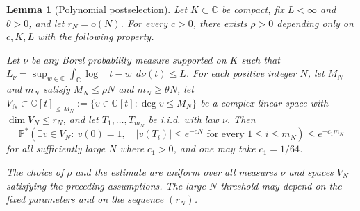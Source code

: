 \documentclass[10pt,reqno]{amsart}
\newtheorem{lemma}[theorem]{Lemma}
\theoremstyle{remark}
\newcommand{\C}{\mathbb C}
\newcommand{\Prob}{\mathbb P}
\newcommand{\logm}{\log^-}
\begin{document}
\begin{lemma}[Polynomial postselection]\label{lem:postselection}
Let $K\subset\C$ be compact, fix $L<\infty$ and $\theta>0$, and let
$r_N=o(N)$. For every $c>0$, there exists $\rho>0$ depending only on $c, K, L$ with the following property.

Let $\nu$ be any Borel probability measure supported on $K$ such that $L_\nu=\sup_{w\in\C} \int_\C\logm|t-w|\,d\nu(t)\le L$.
For each positive integer $N$, let $M_N$ and $m_N$ satisfy $M_N\le\rho N$ and $m_N\ge\theta N$, let $V_N\subset\C[t]_{\le M_N}:=\{v\in \C[t]:\deg v\le M_N\}$ be a complex linear space with $\dim V_N\le r_N$, and let
$T_1,\ldots,T_{m_N}$ be i.i.d. with law $\nu$. Then
\[\Prob^*\!\left( \exists v\in V_N:\ v(0)=1,\quad |v(T_i)|\le e^{-cN}
     \text{ for every }1\le i\le m_N\right)
 \le e^{-c_1m_N}\]
for all sufficiently large $N$ where $c_1>0$, and one may take $c_1=1/64$.

The choice of $\rho$ and the estimate are uniform over all measures $\nu$
and spaces $V_N$ satisfying the preceding assumptions. The large-$N$
threshold may depend on the fixed parameters and on the sequence $(r_N)$.
\end{lemma}
\end{document}
